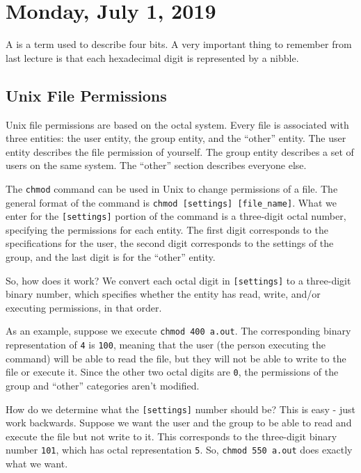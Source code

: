 \section{Monday, July 1, 2019}
A  is a term used to describe four bits. A very important thing to remember from last lecture is that each hexadecimal digit is represented by a nibble.

\subsection{Unix File Permissions}
Unix file permissions are based on the octal system. Every file is associated with three entities: the user entity, the group entity, and the ``other'' entity. The user entity describes the file permission of yourself. The group entity describes a set of users on the same system. The ``other'' section describes everyone else. 


The \verb!chmod! command can be used in Unix to change permissions of a file. The general format of the command is \verb!chmod [settings] [file_name]!. What we enter for the \verb![settings]! portion of the command is a three-digit octal number, specifying the permissions for each entity. The first digit corresponds to the specifications for the user, the second digit corresponds to the settings of the group, and the last digit is for the ``other'' entity. 


So, how does it work? We convert each octal digit in \verb![settings]! to a three-digit binary number, which specifies whether the entity has read, write, and/or executing permissions, in that order.


As an example, suppose we execute \verb!chmod 400 a.out!. The corresponding binary representation of \verb!4! is \verb!100!, meaning that the user (the person executing the command) will be able to read the file, but they will not be able to write to the file or execute it. Since the other two octal digits are \verb!0!, the permissions of the group and ``other'' categories aren't modified.



How do we determine what the \verb![settings]! number should be? This is easy - just work backwards. Suppose we want the user and the group to be able to read and execute the file but not write to it. This corresponds to the three-digit binary number \verb!101!, which has octal representation \verb!5!. So, \verb!chmod 550 a.out! does exactly what we want.



